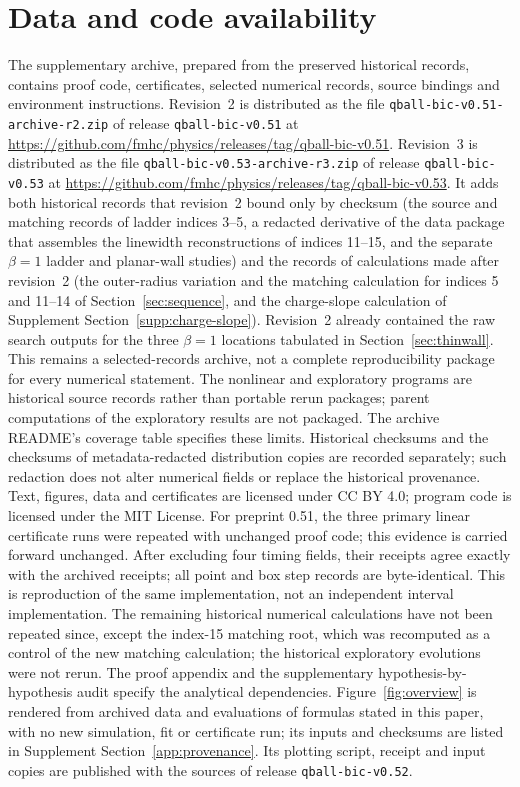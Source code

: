 \documentclass[a4paper,11pt]{article}
\begin{document}
\section*{Data and code availability}
The supplementary archive, prepared from the preserved historical
records, contains proof code, certificates, selected numerical records,
source bindings and environment instructions. Revision~2 is
distributed as the file \texttt{qball-bic-v0.51-archive-r2.zip} of
release \texttt{qball-bic-v0.51} at
\url{https://github.com/fmhc/physics/releases/tag/qball-bic-v0.51}.
Revision~3 is distributed as the file
\texttt{qball-bic-v0.53-archive-r3.zip} of release
\texttt{qball-bic-v0.53} at
\url{https://github.com/fmhc/physics/releases/tag/qball-bic-v0.53}.
It adds both historical records that revision~2 bound only by checksum
(the source and matching records of ladder indices 3--5, a redacted
derivative of the data package that assembles the linewidth
reconstructions of indices 11--15, and the separate $\beta=1$ ladder
and planar-wall studies) and the records of calculations made after
revision~2 (the outer-radius variation and the matching calculation for
indices 5 and 11--14 of Section~\ref{sec:sequence}, and the charge-slope
calculation of Supplement Section~\ref{supp:charge-slope}). Revision~2 already contained the raw search outputs for the three
$\beta=1$ locations tabulated in Section~\ref{sec:thinwall}.
This remains a selected-records archive, not a complete reproducibility
package for every numerical statement. The nonlinear and exploratory
programs are historical source records rather than portable rerun
packages; parent computations of the exploratory results are not
packaged. The archive README's coverage table specifies these limits.
Historical checksums and the checksums of metadata-redacted distribution
copies are recorded separately; such redaction does not alter numerical
fields or replace the historical provenance.
Text, figures, data and certificates are licensed under CC BY 4.0;
program code is licensed under the MIT License. For preprint 0.51, the three primary linear
certificate runs were repeated with unchanged proof code; this evidence is carried forward unchanged. After excluding
four timing fields, their receipts agree exactly with the archived
receipts; all point and box step records are byte-identical. This is
reproduction of the same implementation, not an independent interval
implementation. The remaining historical numerical calculations have not
been repeated since, except the index-15 matching root, which was
recomputed as a control of the new matching calculation; the historical
exploratory evolutions were not rerun. The proof appendix and the
supplementary hypothesis-by-hypothesis audit specify the analytical dependencies.
Figure~\ref{fig:overview} is rendered from archived data and evaluations
of formulas stated in this paper, with no new simulation, fit or
certificate run; its inputs and checksums are listed in Supplement
Section~\ref{app:provenance}. Its plotting script, receipt and input
copies are published with the sources of release
\texttt{qball-bic-v0.52}.
\end{document}
